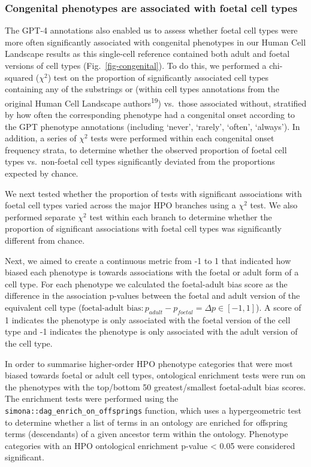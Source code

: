 \documentclass[
]{article}
\begin{document}
\subsubsection{Congenital phenotypes are associated with foetal cell
types}\label{congenital-phenotypes-are-associated-with-foetal-cell-types}

The GPT-4 annotations also enabled us to assess whether foetal cell
types were more often significantly associated with congenital
phenotypes in our Human Cell Landscape results as this single-cell
reference contained both adult and foetal versions of cell types
(Fig.~\ref{fig-congenital}). To do this, we performed a chi-squared
(\(\chi^2\)) test on the proportion of significantly associated cell
types containing any of the substrings or (within cell types annotations
from the original Human Cell Landscape authors\textsuperscript{19})
vs.~those associated without, stratified by how often the corresponding
phenotype had a congenital onset according to the GPT phenotype
annotations (including `never', `rarely', `often', `always'). In
addition, a series of \(\chi^2\) tests were performed within each
congenital onset frequency strata, to determine whether the observed
proportion of foetal cell types vs.~non-foetal cell types significantly
deviated from the proportions expected by chance.

We next tested whether the proportion of tests with significant
associations with foetal cell types varied across the major HPO branches
using a \(\chi^2\) test. We also performed separate \(\chi^2\) test
within each branch to determine whether the proportion of significant
associations with foetal cell types was significantly different from
chance.

Next, we aimed to create a continuous metric from -1 to 1 that indicated
how biased each phenotype is towards associations with the foetal or
adult form of a cell type. For each phenotype we calculated the
foetal-adult bias score as the difference in the association p-values
between the foetal and adult version of the equivalent cell type
(\(\text{foetal-adult bias}: p_{adult} - p_{foetal} = \Delta p \in [-1,1]\)).
A score of 1 indicates the phenotype is only associated with the foetal
version of the cell type and -1 indicates the phenotype is only
associated with the adult version of the cell type.

In order to summarise higher-order HPO phenotype categories that were
most biased towards foetal or adult cell types, ontological enrichment
tests were run on the phenotypes with the top/bottom 50
greatest/smallest foetal-adult bias scores. The enrichment tests were
performed using the \texttt{simona::dag\_enrich\_on\_offsprings}
function, which uses a hypergeometric test to determine whether a list
of terms in an ontology are enriched for offspring terms (descendants)
of a given ancestor term within the ontology. Phenotype categories with
an HPO ontological enrichment p-value \textless{} 0.05 were considered
significant.
\end{document}
